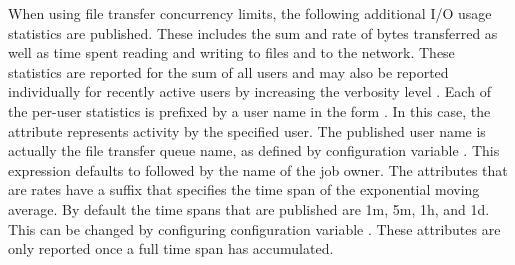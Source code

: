 \label{sec:FT-Scheduler-ClassAd-Attributes}
When using file transfer concurrency limits, 
the following additional I/O usage statistics are published.
These includes the sum and rate of bytes
transferred as well as time spent reading and writing to files and
to the network.  These statistics are reported for the sum of all
users and may also be reported individually for recently active users
by increasing the verbosity level .
Each of the per-user statistics is prefixed by a
user name in the form .
In this case, the attribute represents activity by the specified user.
The published user name is actually the file transfer queue name, 
as defined by configuration variable .
This expression defaults to  followed by the name of the job
owner.
The attributes that are rates have a
suffix that specifies the time span of the exponential moving average.
By default the time spans that are published are 1m, 5m, 1h, and 1d.
This can be changed by configuring configuration variable
.  These attributes are only
reported once a full time span has accumulated.

